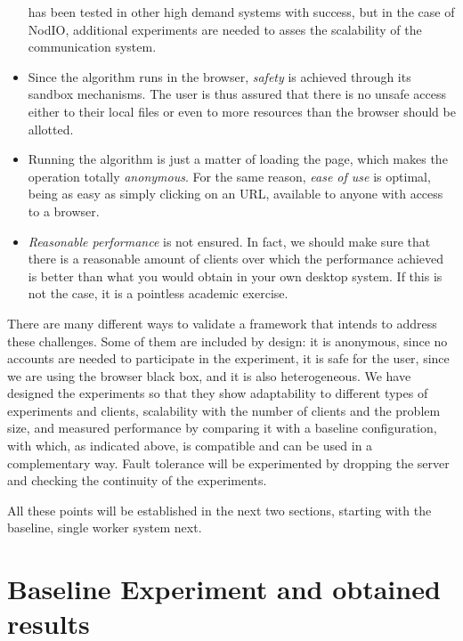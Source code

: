 \documentclass[letterpaper]{article}
\begin{document}
\begin{itemize}
  has been tested in other high demand systems with success, but 
  in the case of {\sf NodIO}, additional experiments are needed to asses 
  the scalability of the communication system. %
\item Since the algorithm runs in the browser, {\em safety} is
  achieved through its sandbox mechanisms. The user is thus assured
  that there is no unsafe access either to their local files or even
  to more resources than the browser should be allotted.
\item Running the algorithm is just a matter of loading the page,
  which makes the operation totally {\em anonymous}. For the same
  reason, {\em ease of use} is optimal, being as easy as simply
  clicking on an URL, available to anyone with access to a browser.
\item {\em Reasonable performance} is not ensured. In fact, we should
  make sure that there is a reasonable amount of clients over which
  the performance achieved is better than what you would obtain in
  your own desktop system. If this is not the case, it is a pointless
  academic exercise.
\end{itemize}

There are many different ways to validate a framework that intends to
address these challenges. Some of them are included by design: it is
anonymous, since no accounts are needed to participate in the
experiment, it is safe for the user, since we are using the browser
black box, and it is also heterogeneous. We have designed the
experiments so that they show adaptability to different types of
experiments and clients, scalability with the number of clients and
the problem size, and measured performance by comparing it with
a baseline configuration, with which, as indicated above, is
compatible and can be used in a complementary way. Fault tolerance
will be experimented by dropping the server and checking the continuity
of the experiments. 

All these points will be established in the next two sections,
starting with the baseline, single worker system next. 

\section{Baseline Experiment and obtained results} %
\label{sec:experiments}
\end{document}
